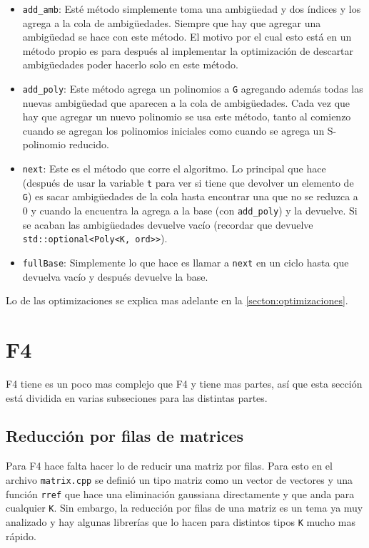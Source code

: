 \documentclass{report}
\theoremstyle{customstyle}
\theoremstyle{factstyle}
\begin{document}
\begin{itemize}
  \item \texttt{add\_amb}: Esté método simplemente toma una ambigüedad y dos índices y los agrega a la cola de ambigüedades. Siempre que hay que agregar una ambigüedad se hace con este método. El motivo por el cual esto está en un método propio es para después al implementar la optimización de descartar ambigüedades poder hacerlo solo en este método.
  \item \texttt{add\_poly}: Este método agrega un polinomios a \texttt{G} agregando además todas las nuevas ambigüedad que aparecen a la cola de ambigüedades. Cada vez que hay que agregar un nuevo polinomio se usa este método, tanto al comienzo cuando se agregan los polinomios iniciales como cuando se agrega un S-polinomio reducido.
  \item \texttt{next}: Este es el método que corre el algoritmo. Lo principal que hace (después de usar la variable \texttt{t} para ver si tiene que devolver un elemento de \texttt{G}) es sacar ambigüedades de la cola hasta encontrar una que no se reduzca a $0$ y cuando la encuentra la agrega a la base (con \texttt{add\_poly}) y la devuelve. Si se acaban las ambigüedades devuelve vacío (recordar que devuelve \texttt{std::optional<Poly<K, ord>>}).
  \item \texttt{fullBase}: Simplemente lo que hace es llamar a \texttt{next} en un ciclo hasta que devuelva vacío y después devuelve la base.
\end{itemize}

Lo de las optimizaciones se explica mas adelante en la \cref{secton:optimizaciones}.


\section{F4}

F4 tiene es un poco mas complejo que F4 y tiene mas partes, así que esta sección está dividida en varias subseciones para las distintas partes.

\subsection{Reducción por filas de matrices}

Para F4 hace falta hacer lo de reducir una matriz por filas. Para esto en el archivo \texttt{matrix.cpp} se definió un tipo matriz como un vector de vectores y una función \texttt{rref} que hace una eliminación gaussiana directamente y que anda para cualquier \texttt{K}. Sin embargo, la reducción por filas de una matriz es un tema ya muy analizado y hay algunas librerías que lo hacen para distintos tipos \texttt{K} mucho mas rápido.
\end{document}
